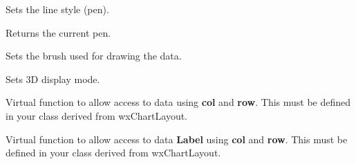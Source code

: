 Sets the line style (pen).

\label{getlinestyle}


Returns the current pen.

\label{setdatastyle}


Sets the brush used for drawing the data.

\label{set3d}


Sets 3D display mode.
	
\label{setdata}

 
Virtual function to allow access to data using {\bf col} and {\bf row}.
This must be defined in your class derived from wxChartLayout. 

\label{setlabel}
	

Virtual function to allow access to data {\bf Label} using {\bf col} and {\bf row}.
This must be defined in your class derived from wxChartLayout. 


